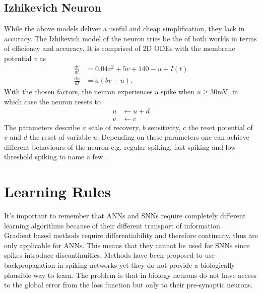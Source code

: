 \subsection{Izhikevich Neuron}
While the above models deliver a useful and cheap simplification, they lack in accuracy. The Izhikevich model \cite{izhikevich_simple_2003} of the neuron tries be the of both worlds in terms of efficiency and accuracy. It is comprised of 2D ODEs with the membrane potential $v$ as
\begin{equation}
\begin{aligned}
\frac{d v}{dt} &= 0.04v^2 + 5v + 140 -u +I(t)\\
\frac{d u}{dt} &= a(bv-u).
\end{aligned}
\end{equation}
With the chosen factors, the neuron experiences a spike when $u\geq30 $mV, in which case the neuron resets to
\begin{equation}
\begin{aligned}
u &\leftarrow u+d\\
v&\leftarrow c
\end{aligned}
\end{equation}
The parameters describe $a$ scale of recovery, $b$ sensitivity, $c$ the reset potential of $v$ and $d$ the reset of variable $u$. Depending on these parameters one can achieve different behaviours of the neuron e.g. regular spiking, fast spiking and low threshold spiking to name a few \cite{izhikevich_simple_2003}.


\section{Learning Rules}
It's important to remember that \acp{ANN} and \acp{SNN} require completely different learning algorithms because of their different transport of information.\\
Gradient based methods require differentiability and therefore continuity, thus are only applicable for \acp{ANN}. This means that they cannot be used for \acp{SNN} since spikes introduce discontinuities. Methods have been proposed to use backpropagation in spiking networks\cite{lee_training_2016} yet they do not provide a biologically plausible way to learn. The problem is that in biology neurons do not have access to the global error from the loss function but only to their pre-synaptic neurons.
